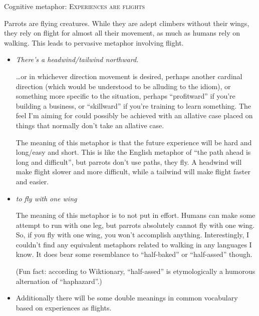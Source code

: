 \documentclass[12pt]{article}
\begin{document}
    Cognitive metaphor: \textsc{Experiences are flights}

    Parrots are flying creatures.
    While they are adept climbers without their wings,
    they rely on flight for almost all their movement,
    as much as humans rely on walking.
    This leads to pervasive metaphor involving flight.

    \begin{itemize}
        \item
        \textit{There's a headwind/tailwind northward.}

        \dots or in whichever direction movement is desired,
        perhaps another cardinal direction
        (which would be understood to be alluding to the idiom),
        or something more specific to the situation,
        perhaps ``profitward'' if you're building a business,
        or ``skillward'' if you're training to learn something.
        The feel I'm aiming for could possibly be achieved with an allative case
        placed on things that normally don't take an allative case.

        The meaning of this metaphor is that the future experience will be
        hard and long/easy and short.
        This is like the English metaphor of ``the path ahead is long and difficult'',
        but parrots don't use paths, they fly.
        A headwind will make flight slower and more difficult,
        while a tailwind will make flight faster and easier.

        \item
        \textit{to fly with one wing}

        The meaning of this metaphor is to not put in effort.
        Humans can make some attempt to run with one leg,
        but parrots absolutely cannot fly with one wing.
        So, if you fly with one wing,
        you won't accomplish anything.
        Interestingly, I couldn't find any equivalent metaphors
        related to walking in any languages I know.
        It does bear some resemblance to ``half-baked'' or ``half-assed'' though.

        (Fun fact: according to Wiktionary,
        ``half-assed'' is etymologically a humorous alternation of ``haphazard''.)

        \item
        Additionally there will be some double meanings in common vocabulary based on experiences as flights.


\end{itemize}
\end{document}
